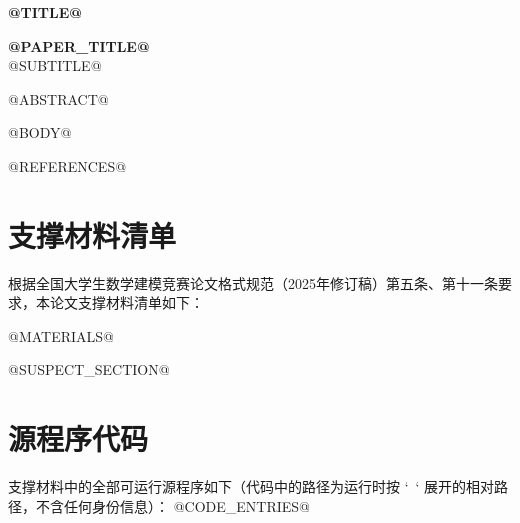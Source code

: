 \documentclass[12pt, a4paper]{article}
\begin{document}
\setcounter{page}{1}
\begin{center}
{\large \textbf{@TITLE@}}
\end{center}
\vspace{0.5cm}
\begin{center}
{\Large\textbf{@PAPER_TITLE@}}\\[0.3em]
{\large @SUBTITLE@}
\end{center}

@ABSTRACT@

\newpage

@BODY@

@REFERENCES@

\newpage
\appendix
\setcounter{table}{0}
\setcounter{figure}{0}
\setcounter{equation}{0}
\renewcommand{\thetable}{\Alph{section}.\arabic{table}}
\renewcommand{\thefigure}{\Alph{section}.\arabic{figure}}
\renewcommand{\theequation}{\Alph{section}.\arabic{equation}}
\section{支撑材料清单}
根据全国大学生数学建模竞赛论文格式规范（2025年修订稿）第五条、第十一条要求，本论文支撑材料清单如下：
\begin{itemize}
@MATERIALS@
\end{itemize}

@SUSPECT_SECTION@
\newpage
\section{源程序代码}
支撑材料中的全部可运行源程序如下（代码中的路径为运行时按 `~` 展开的相对路径，不含任何身份信息）：
@CODE_ENTRIES@
\end{document}
